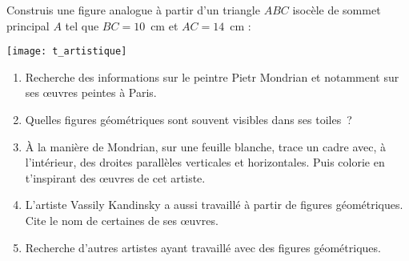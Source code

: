 \begin{enigme}

Construis une figure analogue à partir d'un triangle $ABC$ isocèle de sommet principal $A$ tel que $BC = 10$ cm et $AC = 14$ cm :

\begin{center} \texttt{[image: t\_artistique]} \end{center}

 \end{enigme}
 
 

\begin{enigme}

\begin{enumerate}
 \item Recherche des informations sur le peintre Pietr Mondrian et notamment sur ses œuvres peintes à Paris.
 \item Quelles figures géométriques sont souvent visibles dans ses toiles ?
 \item À la manière de Mondrian, sur une feuille blanche, trace un cadre avec, à l'intérieur, des droites parallèles verticales et horizontales. Puis colorie en t'inspirant des œuvres de cet artiste.
 \item L'artiste Vassily Kandinsky a aussi travaillé à partir de figures géométriques. Cite le nom de certaines de ses œuvres.
 \item Recherche d'autres artistes ayant travaillé avec des figures géométriques.
 \end{enumerate}
 
 \end{enigme}


